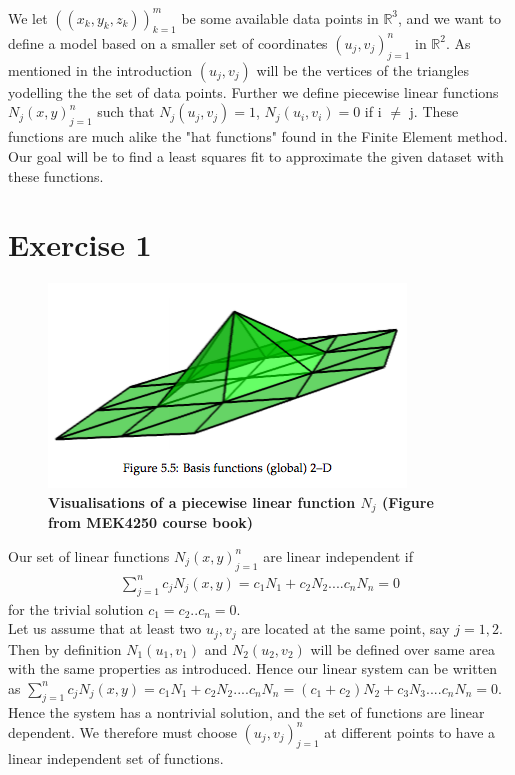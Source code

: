 \documentclass[a4paper,norsk]{article}
\begin{document}
\maketitle
We let $((x_k, y_k, z_k))_{k=1}^m$ be some available data points in $\mathbb{R}^3$, and we want to define a model based on a smaller set of 
coordinates ${(u_j, v_j)}_{j=1}^n$ in $\mathbb{R}^2$. As mentioned in the introduction $(u_j, v_j)$ will be the vertices of the triangles yodelling the the set of
data points. Further we define piecewise linear functions ${N_j(x, y)}_{j=1}^n$ such that $N_j(u_j, v_j) = 1$, $N_j(u_i, v_i) = 0$ if i $\neq$ j. These functions are much alike the "hat functions" found in the Finite Element method. Our goal will be to find a least squares fit to approximate the given dataset with these functions.

\section*{Exercise 1}
\begin{figure}[h!]
	\centering
	\caption*{\textbf{Visualisations of a piecewise linear function $N_j$ \newline (Figure from MEK4250 course book)}}
	\includegraphics[scale=0.36]{element.png}
\end{figure}

Our set of linear functions ${N_j(x, y)}_{j=1}^n$ are linear independent if \begin{align*}
\sum_{j=1}^n c_j N_j(x,y) = c_1 N_1 + c_2 N_2 .... c_n N_n = 0 
\end{align*}
for the trivial solution $c_1 = c_2 .. c_n = 0$. 
\\Let us assume that at least two ${u_j, v_j}$ are located at the same point, say $j = 1,2$. Then by definition $N_1(u_1, v_1)$ and $N_2(u_2, v_2)$ will be defined over same area with the same properties as introduced. Hence our linear system can be written as 
$\sum_{j=1}^n c_j N_j(x,y) = c_1 N_1 + c_2 N_2 .... c_n N_n = (c_1 + c_2)N_2 + c_3 N_3 .... c_n N_n = 0$. Hence the system has a nontrivial solution, and the set of functions are linear dependent. We therefore must
choose ${(u_j, v_j)}_{j=1}^n$ at different points to have a linear independent set of functions. 
\end{document}

